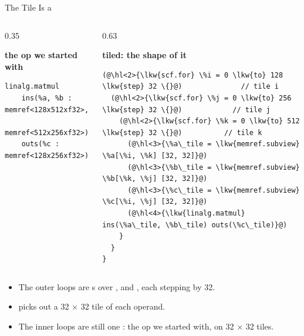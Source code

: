 \documentclass[aspectratio=169,10pt]{beamer}
\begin{document}
\begin{frame}[fragile]{The Tile Is a }
  \begin{columns}[t]
    \begin{column}{0.35\textwidth}
      \begin{center}\small\textbf{the op we started with}\end{center}
\begin{lstlisting}[style=half,language=mlir]
linalg.matmul
    ins(%a, %b : memref<128x512xf32>,
                 memref<512x256xf32>)
    outs(%c : memref<128x256xf32>)
\end{lstlisting}
    \end{column}
    \begin{column}{0.63\textwidth}
      \begin{center}\small\textbf{tiled: the shape of it}\end{center}
\begin{lstlisting}[style=half,language=mlir]
(@\hl<2>{\lkw{scf.for} \%i = 0 \lkw{to} 128 \lkw{step} 32 \{}@)              // tile i
  (@\hl<2>{\lkw{scf.for} \%j = 0 \lkw{to} 256 \lkw{step} 32 \{}@)            // tile j
    (@\hl<2>{\lkw{scf.for} \%k = 0 \lkw{to} 512 \lkw{step} 32 \{}@)          // tile k
      (@\hl<3>{\%a\_tile = \lkw{memref.subview} \%a[\%i, \%k] [32, 32]}@)
      (@\hl<3>{\%b\_tile = \lkw{memref.subview} \%b[\%k, \%j] [32, 32]}@)
      (@\hl<3>{\%c\_tile = \lkw{memref.subview} \%c[\%i, \%j] [32, 32]}@)
      (@\hl<4>{\lkw{linalg.matmul} ins(\%a\_tile, \%b\_tile) outs(\%c\_tile)}@)
    }
  }
}
\end{lstlisting}
    \end{column}
  \end{columns}
  \vspace{0.4em}
  \begin{itemize}
    \item<2-> The outer loops are s over ,  and
      , each stepping by 32.
    \item<3->  picks out a 32 $\times$ 32 tile of each
      operand.
    \item<4-> The inner loops are still one : the op we
      started with, on 32 $\times$ 32 tiles.
  \end{itemize}
\end{frame}
\end{document}
